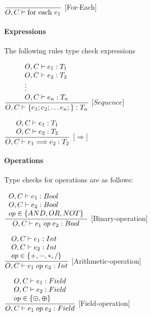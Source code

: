 \hspace*{10em}
$
\dfrac
{\phantom{}}
{O, C \vdash{} \text{for each } e_1 }
$
[For-Each]\bigskip

\paragraph{Expressions}
The following rules type check expressions \bigskip

\hspace*{10em}
$
\dfrac
{
\begin{array}{l}
	{O, C \vdash {} e_1: T_1} \\
	{O, C \vdash{} e_2: T_2} \\
	\vdots \\
	{O, C \vdash{} e_n: T_n}
\end{array}
}
{O, C \vdash{} \{e_1 ; e_2 ; \ldots e_n; \}: T_n}
$
[$Sequence$]\bigskip

\hspace*{10em}
$
\dfrac
{
\begin{array}{l}
	{O, C \vdash {} e_1: T_1} \\
	{O, C \vdash{} e_2: T_2}
\end{array}
}
{O, C \vdash{} e_1 \Longrightarrow e_2 : T_2}
$
[$\Longrightarrow$]

\paragraph{Operations}  Type checks for operations are as follows: \bigskip

\hspace*{10em}
$
\dfrac
{
\begin{array}{l}
	{O, C \vdash {} e_1: Bool} \\
	{O, C \vdash{} e_2: Bool} \\
	op \in \{AND, OR, NOT\}
\end{array}
}
{O, C \vdash{} e_1 \; op \; e_2 : Bool}
$
[Binary-operation]\bigskip

\hspace*{10em}
$
\dfrac
{
\begin{array}{l}
	{O, C \vdash {} e_1: Int} \\
	{O, C \vdash{} e_2: Int} \\
	op \in \{+, -, *, /\}
\end{array}
}
{O, C \vdash{} e_1 \; op \; e_2 : Int}
$
[Arithmetic-operation]\bigskip

\hspace*{10em}
$
\dfrac
{
\begin{array}{l}
	{O, C \vdash {} e_1: Field} \\
	{O, C \vdash{} e_2: Field} \\
	op \in \{ \varodot, \varoplus \}
\end{array}
}
{O, C \vdash{} e_1 \; op \; e_2 : Field}
$
[Field-operation]\bigskip
